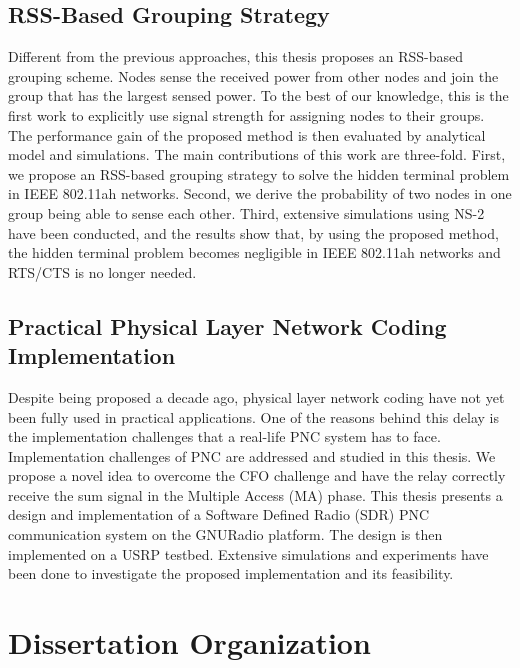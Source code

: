\subsection{RSS-Based Grouping Strategy}


Different from the previous approaches, this thesis proposes an RSS-based grouping scheme.
Nodes sense the received power from other nodes and join the group that has the largest sensed power. To the best of our knowledge, this is the first work to explicitly use signal strength for assigning nodes to their groups. The performance gain of the proposed method is then evaluated by analytical model and simulations. \iffalse CHECK THIS \fi The main contributions of this work are three-fold. First, we propose an RSS-based grouping strategy to solve the hidden terminal problem in IEEE 802.11ah networks. Second, we derive the probability of two nodes in one group being able to sense each other. Third, extensive simulations using NS-2\cite{breslau2000advances} have been conducted, and the results show that, by using the proposed method, the hidden terminal problem becomes negligible in IEEE 802.11ah networks and RTS/CTS is no longer needed.


\subsection{Practical Physical Layer Network Coding Implementation}
Despite being proposed a decade ago, physical layer network coding have not yet been fully used in practical applications. One of the reasons behind this delay is the implementation challenges that a real-life PNC system has to face. Implementation challenges of PNC are addressed and studied in this thesis.
We propose a novel idea to overcome the CFO challenge and have the relay correctly receive the sum signal in the Multiple Access (MA) phase. This thesis presents a design and implementation of a Software Defined Radio (SDR) PNC communication system on the GNURadio platform. The design is then implemented on a USRP testbed. Extensive simulations and experiments have been done to investigate the proposed implementation and its feasibility. 



\section{Dissertation Organization}

